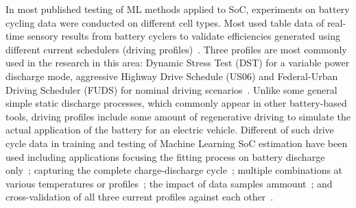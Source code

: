 %
In most published testing of ML methods applied to SoC, experiments on battery cycling data were conducted on different cell types.
Most used table data of real-time sensory results from battery cyclers to validate efficiencies generated using different current schedulers (driving profiles)~\cite{Chemali2017,song_lithium-ion_2018,mamo_long_2020,xiao_accurate_2019}.
Three profiles are most commonly used in the research in this area: Dynamic Stress Test (DST) for a variable power discharge mode, aggressive Highway Drive Schedule (US06) and Federal-Urban Driving Scheduler (FUDS) for nominal driving scenarios~\cite{xiao_accurate_2019,javid_adaptive_2020,mamo_long_2020}.
Unlike some general simple static discharge processes, which commonly appear in other battery-based tools, driving profiles include some amount of regenerative driving to simulate the actual application of the battery for an electric vehicle.
Different of such drive cycle data in training and testing of Machine Learning SoC estimation have been used including applications focusing the fitting process on battery discharge only~\cite{song_lithium-ion_2018,mamo_long_2020,jiao_gru-rnn_2020,javid_adaptive_2020}; capturing the complete charge-discharge cycle~\cite{Chemali2017}; multiple combinations at various temperatures or profiles~\cite{xiao_accurate_2019,mamo_long_2020,Chemali2017,javid_adaptive_2020}; the impact of data samples ammount~\cite{song_lithium-ion_2018}; and cross-validation of all three current profiles against each other~\cite{mamo_long_2020}.
%
